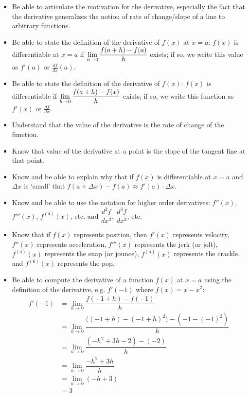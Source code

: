 \documentclass[11pt,letterpaper]{article}
\begin{document}
\begin{itemize}
\item Be able to articulate the motivation for the derivative, especially the fact that the derivative generalizes the notion of rate of change/slope of a line to arbitrary functions. 

\item Be able to state the definition of the derivative of $f(x)$ at $x= a$: $f(x)$ is differentiable at $x= a$ if $\displaystyle\lim_{h \to 0} \dfrac{f(a + h) - f(a)}{h}$ exists; if so, we write this value as $f'(a)$ or $\tfrac{df}{dx} (a)$. 

\item Be able to state the definition of the derivative of $f(x)$: $f(x)$ is differentiable if $\displaystyle\lim_{h \to 0} \dfrac{f(a + h) - f(x)}{h}$ exists; if so, we write this function as $f'(x)$ or $\tfrac{df}{dx}$. 

\item Understand that the value of the derivative is the rate of change of the function.

\item Know that value of the derivative at a point is the slope of the tangent line at that point. 

\item Know and be able to explain why that if $f(x)$ is differentiable at $x= a$ and $\Delta x$ is `small' that $f(a + \Delta x) - f(a) \approx f'(a) \cdot \Delta x$. 

\item Know and be able to use the notation for higher order derivatives: $f''(x)$, $f'''(x)$, $f^{(4)}(x)$, etc. and $\dfrac{d^2f}{dx^2}$, $\dfrac{d^3f}{dx^3}$, etc. 

\item Know that if $f(x)$ represents position, then $f'(x)$ represents velocity, $f''(x)$ represents acceleration, $f'''(x)$ represents the jerk (or jolt), $f^{(4)}(x)$ represents the snap (or jounce), $f^{(5)}(x)$ represents the crackle, and $f^{(6)}(x)$ represents the pop. 

\item Be able to compute the derivative of a function $f(x)$ at $x= a$ using the definition of the derivative, e.g. $f'(-1)$ where $f(x)= x - x^2$:
	\[
	\begin{aligned}
	f'(-1)&= \lim_{h \to 0} \dfrac{f(-1 + h) - f(-1)}{h} \\
	&= \lim_{h \to 0} \dfrac{\big((-1 + h) - (-1 + h)^2 \big) - (-1 - (-1)^2)}{h} \\
	&= \lim_{h \to 0} \dfrac{(-h^2 + 3h - 2) - (-2)}{h} \\
	&= \lim_{h \to 0} \dfrac{-h^2 + 3h}{h} \\
	&= \lim_{h \to 0} (-h + 3) \\
	&= 3
	\end{aligned}
	\]


\end{itemize}
\end{document}
